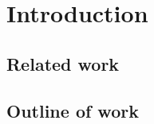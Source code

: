 \section{Introduction} \label{s:intro}
\subsection{Related work} \label{ss:related}

\subsection{Outline of work} \label{ss:outline}
